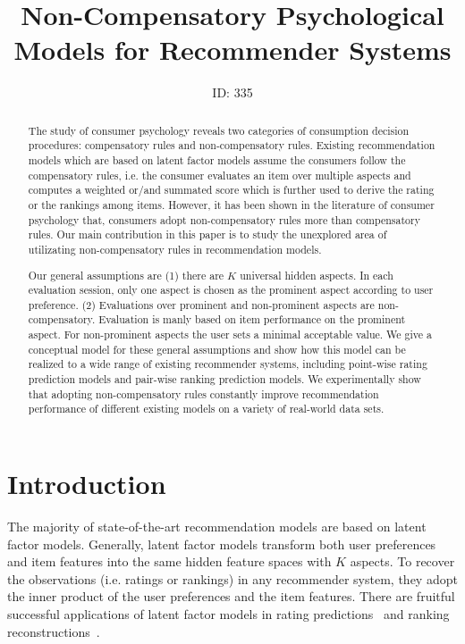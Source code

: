 \documentclass[letterpaper]{article} %
\begin{document}
%
\title{Non-Compensatory Psychological Models for Recommender Systems}
\author{ID: 335
}
\maketitle
\begin{abstract}
The study of consumer psychology reveals two categories of consumption decision procedures: compensatory rules and non-compensatory rules. Existing recommendation models which are based on latent factor models assume the consumers follow the compensatory rules, i.e. the consumer evaluates an item over multiple aspects and computes a weighted or/and summated score which is further used to derive the rating or the rankings among items. However, it has been shown in the literature of consumer psychology that, consumers adopt non-compensatory rules more than compensatory rules. Our main contribution in this paper is to study the unexplored area of utilizating non-compensatory rules in recommendation models. 

Our general assumptions are (1) there are $K$ universal hidden aspects. In each evaluation session, only one aspect is chosen as the prominent aspect according to user preference. (2) Evaluations over prominent and non-prominent aspects are non-compensatory. Evaluation is manly based on item performance on the prominent aspect. For non-prominent aspects the user sets a minimal acceptable value. We give a conceptual model for these general assumptions and show how this model can be realized to a wide range of existing recommender systems, including  point-wise rating prediction models and pair-wise ranking prediction models.  We experimentally show that adopting non-compensatory rules constantly improve recommendation performance of different existing models on a variety of real-world data sets.
\end{abstract}



\section{Introduction}\label{sec:introduction}
The majority of state-of-the-art recommendation models are based on latent factor models. Generally, latent factor models transform both user preferences and item features into the same hidden feature spaces with $K$ aspects. To recover the observations (i.e. ratings or rankings) in any recommender system, they adopt the inner product of the user preferences and the item features. There are fruitful successful applications of latent factor models in  rating predictions~\cite{Koren2009Matrix,Koren2010Factor,Lee2014Local} and ranking reconstructions~\cite{Rendle2009BPR,Steck2015Gaussian,Zhao2018Factored,Shi2010List}.   
\end{document}
